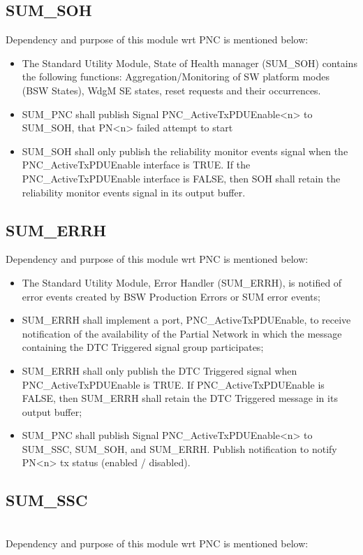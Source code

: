 \subsection{SUM\_SOH}
Dependency and purpose of this module wrt PNC is mentioned below:

\begin{itemize}
	\item The Standard Utility Module, State of Health manager (SUM\_SOH) contains the following functions: Aggregation/Monitoring of SW platform modes (BSW States), WdgM SE states, reset requests and their occurrences.
	\item SUM\_PNC shall publish Signal PNC\_ActiveTxPDUEnable<n> to SUM\_SOH, that PN<n> failed attempt to start
	\item SUM\_SOH shall only publish the reliability monitor events signal when the PNC\_ActiveTxPDUEnable interface is TRUE. If the PNC\_ActiveTxPDUEnable interface is FALSE, then SOH shall retain the reliability monitor events signal in its output buffer.
\end{itemize}

\subsection{SUM\_ERRH}
Dependency and purpose of this module wrt PNC is mentioned below:

\begin{itemize}
	\item The Standard Utility Module, Error Handler (SUM\_ERRH), is notified of error events created by BSW Production Errors or SUM error events;
	\item SUM\_ERRH shall implement a port, PNC\_ActiveTxPDUEnable, to receive notification of the availability of the Partial Network in which the message containing the DTC Triggered signal group participates;
	\item SUM\_ERRH shall only publish the DTC Triggered signal when PNC\_ActiveTxPDUEnable is TRUE. If PNC\_ActiveTxPDUEnable is FALSE, then SUM\_ERRH shall retain the DTC Triggered message in its output buffer;
	\item SUM\_PNC shall publish Signal PNC\_ActiveTxPDUEnable<n> to SUM\_SSC, SUM\_SOH, and SUM\_ERRH. Publish notification to notify PN<n> tx status (enabled / disabled).
\end{itemize}

\subsection{SUM\_SSC}
\\
Dependency and purpose of this module wrt PNC is mentioned below:

